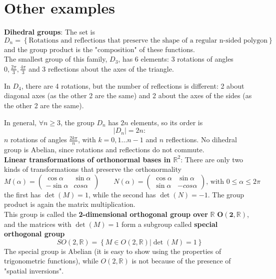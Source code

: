
\section{Other examples}
\textbf{Dihedral groups}: The set is
$$D_n = \left\{\text{Rotations and reflections that preserve the shape of a regular
n-sided polygon}\right\}$$
and the group product is the "composition" of these functions.\\
The smallest group of this family, $D_3$, has 6 elements: 3 rotations of angles
$0,\frac{2\pi}{3},\frac{4\pi}{3}$ and 3 reflections about the axes of the triangle.

In $D_4$, there are 4 rotations, but the number of reflections is different: 2 about
diagonal axes (as the other 2 are the same) and 2 about the axes of the
sides (as the other 2 are the same).

In general, $\forall n\geq3$, the group $D_n$ has $2n$ elements, so its order is
$$|D_n|=2n:$$
$n$ rotations of angles $\frac{2k\pi}{n}$, with $k=0,1...n-1$ and $n$ reflections.
No dihedral group is Abelian, since rotations and reflections do not commute.\\

\textbf{Linear transformations of orthonormal bases in $\mathbb{R}^2$}: There are only
two kinds of transformations that preserve the orthonormality
$$M(\alpha)=\begin{pmatrix}
    \cos\alpha&\sin\alpha\\
    -\sin\alpha&cos\alpha
\end{pmatrix}\qquad
N(\alpha)=\begin{pmatrix}
    \cos\alpha&\sin\alpha\\
    \sin\alpha&-cos\alpha
\end{pmatrix}\text{, with }0\leq\alpha\leq2\pi
$$
the first has $\det(M)=1$, while the second has $\det(N)=-1$. The group product is
again the matrix multiplication.\\
This group is called the \textbf{2-dimensional orthogonal group over} $\mathbb{R}$
$\mathbf{O(2,\mathbb{R})}$, and the
matrices with $\det(M)=1$ form a subgroup called \textbf{special orthogonal group}
$$SO(2,\mathbb{R}) = \left\{M\in O(2,\mathbb{R})| \det(M)=1\right\}$$
The special group is Abelian (it is easy to show using the properties of trigonometric
functions), while $O(2,\mathbb{R})$ is not because of the presence of "spatial
inversions".\\

